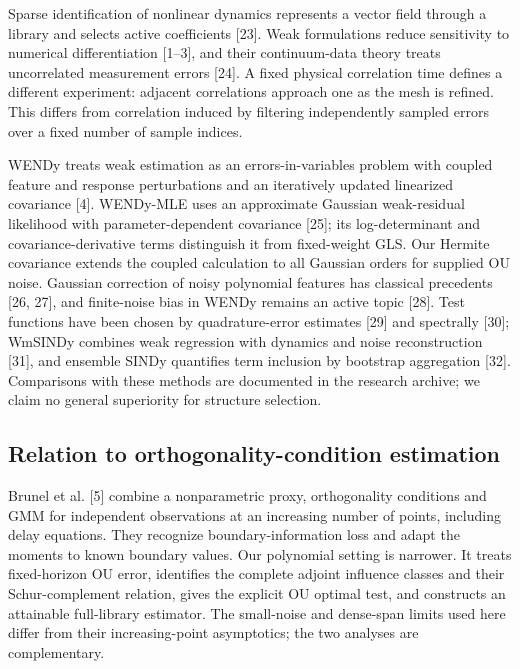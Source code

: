 \documentclass[ejs]{imsart}
\begin{document}
Sparse identification of nonlinear dynamics represents a vector field
through a library and selects active coefficients {[}23{]}. Weak
formulations reduce sensitivity to numerical differentiation {[}1--3{]},
and their continuum-data theory treats uncorrelated measurement errors
{[}24{]}. A fixed physical correlation time defines a different
experiment: adjacent correlations approach one as the mesh is refined.
This differs from correlation induced by filtering independently sampled
errors over a fixed number of sample indices.

WENDy treats weak estimation as an errors-in-variables problem with
coupled feature and response perturbations and an iteratively updated
linearized covariance {[}4{]}. WENDy-MLE uses an approximate Gaussian
weak-residual likelihood with parameter-dependent covariance {[}25{]};
its log-determinant and covariance-derivative terms distinguish it from
fixed-weight GLS. Our Hermite covariance extends the coupled calculation
to all Gaussian orders for supplied OU noise. Gaussian correction of
noisy polynomial features has classical precedents {[}26, 27{]}, and
finite-noise bias in WENDy remains an active topic {[}28{]}. Test
functions have been chosen by quadrature-error estimates {[}29{]} and
spectrally {[}30{]}; WmSINDy combines weak regression with dynamics and
noise reconstruction {[}31{]}, and ensemble SINDy quantifies term
inclusion by bootstrap aggregation {[}32{]}. Comparisons with these
methods are documented in the research archive; we claim no general
superiority for structure selection.

\subsection{Relation to orthogonality-condition
estimation}\label{relation-to-orthogonality-condition-estimation}

Brunel et al. {[}5{]} combine a nonparametric proxy, orthogonality
conditions and GMM for independent observations at an increasing number
of points, including delay equations. They recognize
boundary-information loss and adapt the moments to known boundary
values. Our polynomial setting is narrower. It treats fixed-horizon OU
error, identifies the complete adjoint influence classes and their
Schur-complement relation, gives the explicit OU optimal test, and
constructs an attainable full-library estimator. The small-noise and
dense-span limits used here differ from their increasing-point
asymptotics; the two analyses are complementary.
\end{document}
